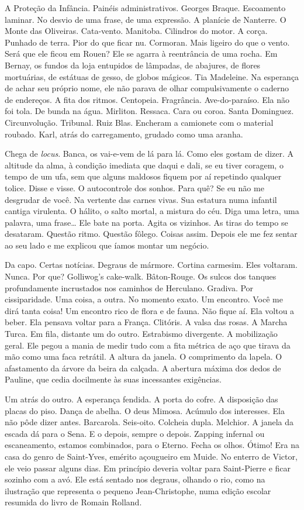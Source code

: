 A Proteção da Infância. Painéis administrativos. Georges Braque.
Escoamento laminar. No desvio de uma frase, de uma expressão. A planície
de Nanterre. O Monte das Oliveiras. Cata-vento. Manitoba. Cilindros do
motor. A corça. Punhado de terra. Pior do que ficar nu. Cormoran. Mais
ligeiro do que o vento. Será que ele ficou em Rouen? Ele se agarra à
reentrância de uma rocha. Em Bernay, os fundos da loja entupidos de
lâmpadas, de abajures, de flores mortuárias, de estátuas de gesso, de
globos mágicos. Tia Madeleine. Na esperança de achar seu próprio nome,
ele não parava de olhar compulsivamente o caderno de endereços. A fita
dos ritmos. Centopeia. Fragrância. Ave-do-paraíso. Ela não foi tola. De
bunda na água. Mirliton. Ressaca. Cara ou coroa. Santa Dominguez.
Circunvolução. Tribunal. Ruiz Blas. Encheram a camionete com o material
roubado. Karl, atrás do carregamento, grudado como uma aranha.

Chega de \emph{locus}. Banca, os vai-e-vem de lá para lá. Como eles
gostam de dizer. A altitude da alma, à condição imediata que daqui e
dali, se eu tiver coragem, o tempo de um ufa, sem que alguns maldosos
fiquem por aí repetindo qualquer tolice. Disse e visse. O autocontrole
dos sonhos. Para quê? Se eu não me desgrudar de você. Na vertente das
carnes vivas. Sua estatura numa infantil cantiga virulenta. O hálito, o
salto mortal, a mistura do céu. Diga uma letra, uma palavra, uma
frase\ldots{} Ele bate na porta. Agita os vizinhos. As tiras do tempo se
desataram. Questão ritmo. Questão fôlego. Coisas assim. Depois ele me
fez sentar ao seu lado e me explicou que íamos montar um negócio.

Da capo. Certas notícias. Degraus de mármore. Cortina carmesim. Eles
voltaram. Nunca. Por que? Golliwog's cake-walk. Bâton-Rouge. Os sulcos
dos tanques profundamente incrustados nos caminhos de Herculano.
Gradiva. Por cissiparidade. Uma coisa, a outra. No momento exato. Um
encontro. Você me dirá tanta coisa! Um encontro rico de flora e de
fauna. Não fique aí. Ela voltou a beber. Ela pensava voltar para a
França. Clitóris. A valsa das rosas. A Marcha Turca. Em fila, distante
um do outro. Estrabismo divergente. A mobilização geral. Ele pegou a
mania de medir tudo com a fita métrica de aço que tirava da mão como uma
faca retrátil. A altura da janela. O comprimento da lapela. O
afastamento da árvore da beira da calçada. A abertura máxima dos dedos
de Pauline, que cedia docilmente às suas incessantes exigências.

Um atrás do outro. A esperança fendida. A porta do cofre. A disposição
das placas do piso. Dança de abelha. O deus Mimosa. Acúmulo dos
interesses. Ela não pôde dizer antes. Barcarola. Seis-oito. Colcheia
dupla. Melchior. A janela da escada dá para o Sena. E o depois, sempre o
depois. Zapping infernal ou escaneamento, estamos combinados, para o
Eterno. Fecha os olhos. Ótimo! Era na casa do genro de Saint-Yves,
emérito açougueiro em Muide. No enterro de Victor, ele veio passar
alguns dias. Em princípio deveria voltar para Saint-Pierre e ficar
sozinho com a avó. Ele está sentado nos degraus, olhando o rio, como na
ilustração que representa o pequeno Jean-Christophe, numa edição escolar
resumida do livro de Romain Rolland.

